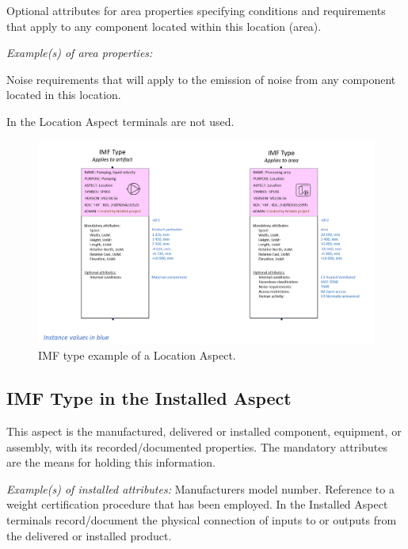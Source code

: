 \documentclass[../main.tex]{subfiles}
\begin{document}
Optional attributes for area properties specifying conditions and requirements that apply to any component located within this
location (area).

\emph{Example(s) of area properties:}

 Noise requirements that will apply to the emission of noise from any component located in this location.

In the Location Aspect terminals are not used.

\begin{figure}[htb]
  \centering
  \includegraphics[width=1\textwidth]{img/IMFmanual-img070.png}

  \caption{IMF type example of a Location Aspect.}
  \label{fig:Figure 52}
\end{figure}

\subsection{IMF Type in the Installed Aspect}
This aspect is the manufactured, delivered or installed component, equipment, or assembly,
with its recorded/documented properties. The mandatory attributes are the means for holding this information.

\emph{Example(s) of installed attributes:}
Manufacturers model number.
Reference to a weight certification procedure that has been employed. In the Installed Aspect terminals
        record/document the physical connection of inputs to or outputs from the delivered or installed product.
\end{document}
